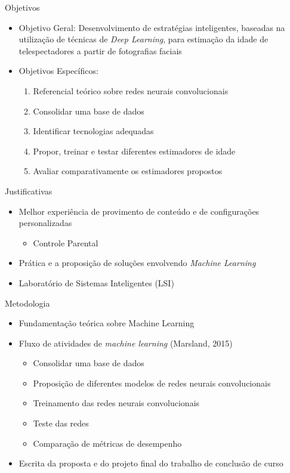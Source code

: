 \begin{frame}{Objetivos}
   \ \  \\[0.1cm]
  \begin{itemize}
  \item \alert{Objetivo Geral}: Desenvolvimento de estratégias inteligentes, baseadas na utilização de técnicas de \emph{Deep Learning}, para estimação da idade de telespectadores a partir de fotografias faciais
  \item \alert{Objetivos Específicos}:
  \begin{enumerate}
    \item Referencial teórico sobre redes neurais convolucionais
    \item Consolidar uma base de dados
    \item Identificar tecnologias adequadas
    \item Propor, treinar e testar diferentes estimadores de idade
    \item Avaliar comparativamente os estimadores propostos

  \end{enumerate}
\end{itemize}
\end{frame}

\begin{frame}{Justificativas}
  \begin{itemize}
  \item Melhor experiência de provimento de conteúdo e de configurações personalizadas
  \begin{itemize}
    \item \alert{Controle Parental}
  \end{itemize}
  \item Prática e a proposição de soluções envolvendo \emph{Machine Learning}
  \item Laboratório de Sistemas Inteligentes (LSI)
\end{itemize}
\end{frame}

\begin{frame}{Metodologia}
   \ \  \\[0.1cm]
  \begin{itemize}
  \item Fundamentação teórica sobre Machine Learning
  \item Fluxo de atividades de \emph{machine learning} (Marsland, 2015)
  \begin{itemize}
    \item Consolidar uma base de dados
    \item Proposição de diferentes modelos de redes neurais convolucionais
    \item Treinamento das redes neurais convolucionais
    \item Teste das redes
    \item Comparação de métricas de desempenho
  \end{itemize}
  \item Escrita da proposta e do projeto final do trabalho de conclusão de curso
\end{itemize}
\end{frame}

